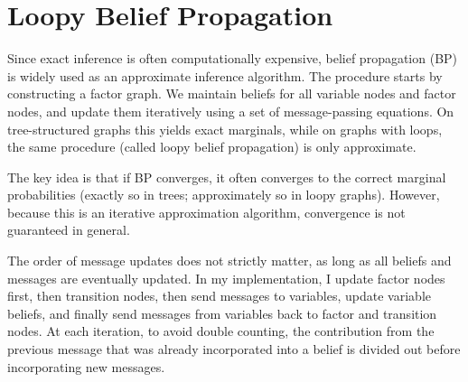 \newpage
\section{Loopy Belief Propagation}

Since exact inference is often computationally expensive, belief propagation (BP) is widely used as an approximate inference algorithm. The procedure starts by constructing a factor graph. We maintain beliefs for all variable nodes and factor nodes, and update them iteratively using a set of message-passing equations. On tree-structured graphs this yields exact marginals, while on graphs with loops, the same procedure (called loopy belief propagation) is only approximate.

The key idea is that if BP converges, it often converges to the correct marginal probabilities (exactly so in trees; approximately so in loopy graphs). However, because this is an iterative approximation algorithm, convergence is not guaranteed in general.

The order of message updates does not strictly matter, as long as all beliefs and messages are eventually updated. In my implementation, I update factor nodes first, then transition nodes, then send messages to variables, update variable beliefs, and finally send messages from variables back to factor and transition nodes. At each iteration, to avoid double counting, the contribution from the previous message that was already incorporated into a belief is divided out before incorporating new messages.

